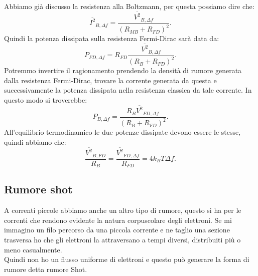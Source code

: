 Abbiamo già discusso la resistenza alla Boltzmann, per questa possiamo dire che:
\[
	\overline{I^2}_{B, \Delta f}
	= 
	\frac{\overline{V^2}_{B, \Delta f}}{\left( R_{MB}+ R_{FD} \right)^2}
.\] 
Quindi la potenza dissipata sulla resistenza Fermi-Dirac sarà data da:
\[
	P_{FD,\Delta f}
	=
	R_{FD} 
	\frac{\overline{V^2}_{B, \Delta f}}{\left( R_B + R_{FD} \right)^2}
.\] 
Potremmo invertire il ragionamento prendendo la densità di rumore generata dalla resistenza Fermi-Dirac, trovare la corrente generata da questa e successivamente la potenza dissipata nella resistenza classica da tale corrente. In questo modo si troverebbe:
\[
	P_{B,\Delta f}
	=
	\frac{R_B \overline{V^2}_{FD,\Delta f}}{\left( R_B + R_{FD} \right)^2} 
.\] 
All'equilibrio termodinamico le due potenze dissipate devono essere le stesse, quindi abbiamo che:
\[
	\frac{\overline{V^2}_{B, FD}}{R_B} 
	= 
	\frac{\overline{V^2}_{FD,\Delta f}}{R_{FD}}
	=
	4k_B T \Delta f
.\] 
\subsection{Rumore shot}
\label{subsec:Rumore shot}
A correnti piccole abbiamo anche un altro tipo di rumore, questo si ha per le correnti che rendono evidente la natura corpuscolare degli elettroni. 
Se mi immagino un filo percorso da una piccola corrente e ne taglio una sezione trasversa ho che gli elettroni la attraversano a tempi diversi, distribuiti più o meno casualmente.\\ 
Quindi non ho un flusso uniforme di elettroni e questo può generare la forma di rumore detta rumore Shot.\\
